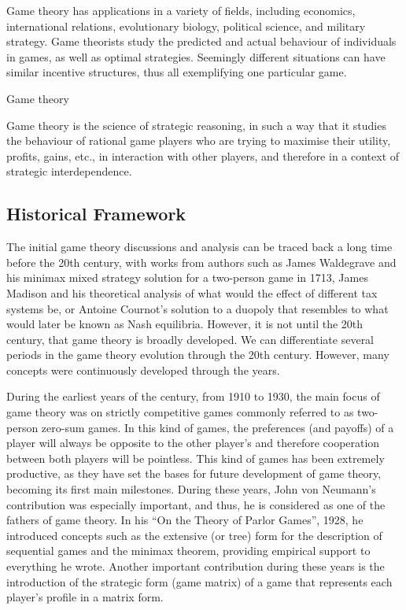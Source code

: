 Game theory has applications in a variety of fields, including economics,  international relations, evolutionary biology, political science, and  military strategy. Game theorists study the predicted and actual  behaviour of individuals in games, as well as optimal strategies.  Seemingly different situations can have similar incentive  structures, thus all exemplifying one particular game. 

Game theory

Game theory is the science of strategic reasoning, in such a way that it studies the behaviour of rational game players who are trying to maximise their utility, profits, gains, etc., in interaction with other players, and therefore in a context of strategic interdependence.

 

\subsection{Historical Framework}

The initial game theory discussions and analysis can be traced back a long time before the 20th century, with works from authors such as James Waldegrave and his minimax mixed strategy solution for a two-person game in 1713, James Madison and his theoretical analysis of what would the effect of different tax systems be, or Antoine Cournot’s solution to a duopoly that resembles to what would later be known as Nash equilibria. However, it is not until the 20th century, that game theory is broadly developed. We can differentiate several periods in the game theory evolution through the 20th century. However, many concepts were continuously developed through the years.

During the earliest years of the century, from 1910 to 1930, the main focus of game theory was on  strictly competitive games commonly referred to as two-person zero-sum games. In this kind of games, the preferences (and payoffs) of a player will always be opposite to the other player’s and therefore cooperation between both players will be pointless. This kind of games has been extremely productive, as they have set the bases for future development of game theory, becoming its first main milestones. During these years, John von Neumann’s contribution was especially important, and thus, he is considered as one of the fathers of game theory.  In his “On the Theory of Parlor Games”, 1928, he introduced concepts such as the extensive (or tree) form for the description of sequential games and the minimax theorem, providing empirical support to everything he wrote. Another important contribution during these years is the introduction of the strategic form (game matrix) of a game that represents each player’s profile in a matrix form.


